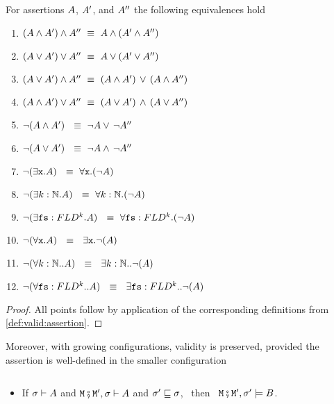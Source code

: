 \begin{lemma}
For     assertions $A$, $A'$, and $A''$ the following equivalences hold
\label{lemma:basic_assertions_classical}
\begin{enumerate}
\item
$(A \wedge A') \wedge A'' \ \equiv \  A \wedge (A' \wedge A'')$
\item 
$(A \vee A') \vee A'' \ \equiv \  A \vee (A' \vee A'')$
\item 
$(A \vee A') \wedge A'' \ \equiv \  (A \wedge A')\, \vee\, (A \wedge A'')$
\item 
$(A \wedge A') \vee A'' \ \equiv \  (A \vee A')\, \wedge\, (A \vee A'')$
\item 
$\neg (A \wedge A') \  \ \equiv \  \neg  A   \vee\, \neg A''$
\item 
$\neg (A \vee A') \  \ \equiv \  \neg  A   \wedge\, \neg A''$
\item
$\neg (\exists \prg{x}.\A )  \  \ \equiv \  \forall \prg{x}.(\neg  \A)$
\item
$\neg (\exists k:\mathbb{N}.\A )  \  \ \equiv \  \forall  k:\mathbb{N}.(\neg  \A)$
\item
$\neg (\exists {\mbox{\tt{fs}}}:FLD^k.A )  \  \ \equiv \  \forall {\mbox{\tt{fs}}}:FLD^k.(\neg  A)$
\item
$\neg (\forall \prg{x}. \A)  \  \ \equiv \  \  \exists \prg{x}.\neg(\A )$
\item
$\neg (\forall k:\mathbb{N}.. \A)  \  \ \equiv \  \  \exists k:\mathbb{N}..\neg(\A )$
\item
$\neg (\forall {\mbox{\tt{fs}}}:FLD^k.. A)  \  \ \equiv \  \  \exists {\mbox{\tt{fs}}}:FLD^k..\neg(A )$
\end{enumerate}
\end{lemma}
\begin{proof}
All points follow by application of the corresponding definitions from \ref{def:valid:assertion}.
 \end{proof}

Moreover, with growing configurations, validity is preserved, provided the assertion is well-defined in the smaller configuration
 

\begin{lemma} $ $
\label{lemma:preserve:valid}
\begin{itemize}
\item
If  $\sigma \vdash A$ and ${\mbox{\tt{\ensuremath{{\mbox{\tt{M}}}}}}}\fatsemi {\mbox{\tt{\ensuremath{{\mbox{\tt{M}}}}}}}',  \sigma \vdash A$ and   $\sigma' \sqsubseteq \sigma$, \  then  \ ${\mbox{\tt{\ensuremath{{\mbox{\tt{M}}}}}}}\fatsemi {\mbox{\tt{\ensuremath{{\mbox{\tt{M}}}}}}}',  \sigma' \models B$.
\end{itemize}
\end{lemma}

